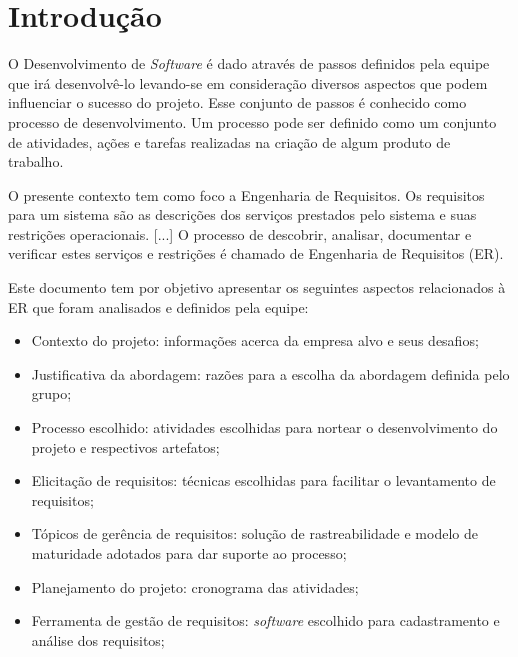 \chapter{Introdução}
\label{introduction}

O Desenvolvimento de \textit{Software} é dado através de passos definidos pela equipe que irá desenvolvê-lo levando-se em consideração diversos aspectos que podem influenciar o sucesso do projeto. Esse conjunto de passos é conhecido como processo de desenvolvimento. Um processo pode ser definido como um conjunto de atividades, ações e tarefas realizadas na criação de algum produto de trabalho.~\cite{pressman}

O presente contexto tem como foco a Engenharia de Requisitos. Os requisitos para um sistema são as descrições dos serviços prestados pelo sistema e suas restrições operacionais. [...] O processo de descobrir, analisar, documentar e verificar estes serviços e restrições é chamado de Engenharia de Requisitos (ER).~\cite{sommerville}

Este documento tem por objetivo apresentar os seguintes aspectos relacionados à ER que foram analisados e definidos pela equipe:
\begin{itemize}
\item Contexto do projeto: informações acerca da empresa alvo e seus desafios;
\item Justificativa da abordagem: razões para a escolha da abordagem definida pelo grupo;
\item Processo escolhido: atividades escolhidas para nortear o desenvolvimento do projeto e respectivos artefatos;
\item Elicitação de requisitos: técnicas escolhidas para facilitar o levantamento de requisitos;
\item Tópicos de gerência de requisitos: solução de rastreabilidade e modelo de maturidade adotados para dar suporte ao processo;
\item Planejamento do projeto: cronograma das atividades;
\item Ferramenta de gestão de requisitos: \textit{software} escolhido para cadastramento e análise dos requisitos;
\end{itemize}
